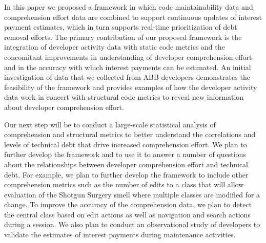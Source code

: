 In this paper we proposed a framework in which code maintainability data and comprehension effort data are combined to support continuous updates of interest payment estimates, which in turn supports real-time prioritization of debt removal efforts. The primary contribution of our proposed framework is the integration of developer activity data with static code metrics and the concomitant improvements in understanding of developer comprehension effort and in the accuracy with which interest payments can be estimated. An initial investigation of data that we collected from ABB developers demonstrates the feasibility of the framework and provides examples of how the developer activity data work in concert with structural code metrics to reveal new information about developer comprehension effort.

Our next step will be to conduct a large-scale statistical analysis of comprehension and structural metrics to better understand the correlations and levels of technical debt that drive increased comprehension effort.  We plan to further develop the framework and to use it to answer a number of questions about the relationships between developer comprehension effort and technical debt.  For example, we plan to further develop the framework to include other comprehension metrics such as the number of edits to a class that will allow evaluation of the Shotgun Surgery smell where multiple classes are modified for a change.  To improve the accuracy of the comprehension data, we plan to detect the central class based on edit actions as well as navigation and search actions during a session.  We also plan to conduct an observational study of developers to validate the estimates  of interest payments during maintenance activities.